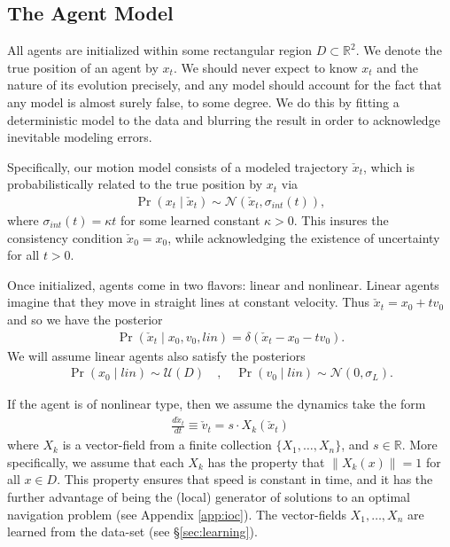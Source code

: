 \documentclass[conference]{IEEEtran}
\begin{document}
\subsection{The Agent Model}
All agents are initialized within some rectangular region $D \subset \mathbb{R}^2$.
We denote the true position of an agent by $x_t$.
We should never expect to know $x_t$ and the nature of its evolution precisely, and any model should account for the fact that any model is almost surely false, to some degree.
We do this by fitting a deterministic model to the data and blurring the result in order to acknowledge inevitable modeling errors.

Specifically, our motion model consists of a modeled trajectory $\check{x}_t$, which is probabilistically related to the true position by $x_t$ via 
\begin{align*}
	\Pr( x_t \mid \check{x}_t ) \sim \mathcal{N}( \check{x}_t, \sigma_{int}(t)),
\end{align*}
where $\sigma_{int}(t) = \kappa t$ for some learned constant $\kappa > 0$.
This insures the consistency condition $\check{x}_0 = x_0$, while acknowledging the existence of uncertainty for all $t>0$.

Once initialized, agents come in two flavors: linear and nonlinear.
Linear agents imagine that they move in straight lines at constant velocity.
Thus $\check{x}_t = x_0 + t v_0$ and so we have the posterior
\begin{align*}
	\Pr( \check{x}_t \mid x_0, v_0, lin) = \delta( \check{x}_t - x_0 - t v_0 ).
\end{align*}
We will assume linear agents also satisfy the posteriors
\begin{align*}
	\Pr( x_0 \mid lin ) \sim \mathcal{U}( D)\quad,\quad \Pr( v_0 \mid lin ) \sim \mathcal{N}( 0 , \sigma_L).
\end{align*}

If the agent is of nonlinear type, then we assume the dynamics take the form
\begin{align}
	\frac{d \check{x}_t}{dt} \equiv \check{v}_t = s \cdot X_k(\check{x}_t) \label{eq:ode}
\end{align}
where $X_k$ is a vector-field from a finite collection $\{X_1, \dots, X_n\}$, and $s \in \mathbb{R}$.
More specifically, we assume that each $X_k$ has the property that $\| X_k(x) \| = 1$ for all $x \in D$.
This property ensures that speed is constant in time, and it has the further advantage of being the (local) generator
of solutions to an optimal navigation problem (see Appendix \ref{app:ioc}).
The vector-fields $X_1,\dots,X_n$ are learned from the data-set (see \S \ref{sec:learning}).
\end{document}
